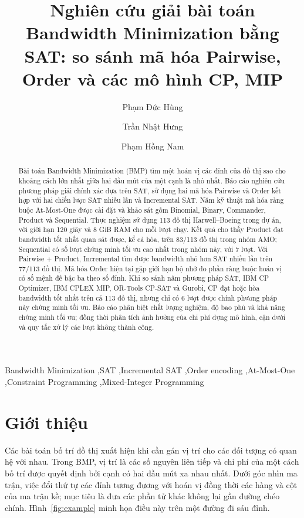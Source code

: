 \documentclass[a4paper,fleqn]{cas-sc}
\begin{document}
\title[mode=title]{Nghiên cứu giải bài toán Bandwidth Minimization bằng SAT: so sánh mã hóa Pairwise, Order và các mô hình CP, MIP}
\author[1]{Phạm Đức Hùng}
\author[1]{Trần Nhật Hưng}
\author[1]{Phạm Hồng Nam}
\begin{abstract}
Bài toán Bandwidth Minimization (BMP) tìm một hoán vị các đỉnh của đồ thị sao cho khoảng cách lớn nhất giữa hai đầu mút của một cạnh là nhỏ nhất. Báo cáo nghiên cứu phương pháp giải chính xác dựa trên SAT, sử dụng hai mã hóa Pairwise và Order kết hợp với hai chiến lược SAT nhiều lần và Incremental SAT. Năm kỹ thuật mã hóa ràng buộc At-Most-One được cài đặt và khảo sát gồm Binomial, Binary, Commander, Product và Sequential. Thực nghiệm sử dụng 113 đồ thị Harwell--Boeing trong dự án, với giới hạn 120 giây và 8 GiB RAM cho mỗi lượt chạy. Kết quả cho thấy Product đạt bandwidth tốt nhất quan sát được, kể cả hòa, trên 83/113 đồ thị trong nhóm AMO; Sequential có số lượt chứng minh tối ưu cao nhất trong nhóm này, với 7 lượt. Với Pairwise + Product, Incremental tìm được bandwidth nhỏ hơn SAT nhiều lần trên 77/113 đồ thị. Mã hóa Order hiện tại gặp giới hạn bộ nhớ do phần ràng buộc hoán vị có số mệnh đề bậc ba theo số đỉnh. Khi so sánh năm phương pháp SAT, IBM CP Optimizer, IBM CPLEX MIP, OR-Tools CP-SAT và Gurobi, CP đạt hoặc hòa bandwidth tốt nhất trên cả 113 đồ thị, nhưng chỉ có 6 lượt được chính phương pháp này chứng minh tối ưu. Báo cáo phân biệt chất lượng nghiệm, độ bao phủ và khả năng chứng minh tối ưu; đồng thời phân tích ảnh hưởng của chi phí dựng mô hình, cận dưới và quy tắc xử lý các lượt không thành công.
\end{abstract}
\begin{keywords}
Bandwidth Minimization \sep SAT \sep Incremental SAT \sep Order encoding \sep At-Most-One \sep Constraint Programming \sep Mixed-Integer Programming
\end{keywords}
\maketitle

\section{Giới thiệu}
Các bài toán bố trí đồ thị xuất hiện khi cần gán vị trí cho các đối tượng có quan hệ với nhau. Trong BMP, vị trí là các số nguyên liên tiếp và chi phí của một cách bố trí được quyết định bởi cạnh có hai đầu mút xa nhau nhất. Dưới góc nhìn ma trận, việc đổi thứ tự các đỉnh tương đương với hoán vị đồng thời các hàng và cột của ma trận kề; mục tiêu là đưa các phần tử khác không lại gần đường chéo chính. Hình~\ref{fig:example} minh họa điều này trên một đường đi sáu đỉnh.
\end{document}
